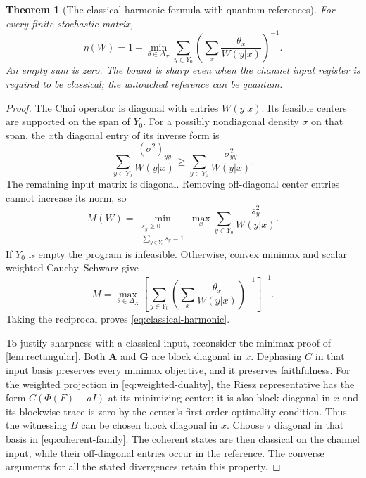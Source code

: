 \documentclass[11pt]{article}
\numberwithin{equation}{section}
\newtheorem{theorem}{Theorem}[section]
\theoremstyle{definition}
\theoremstyle{remark}
\begin{document}
\begin{theorem}[The classical harmonic formula with quantum references]
\label{thm:classical}
For every finite stochastic matrix,
\begin{equation}
 \boxed{\quad
 \eta(W)=1-\min_{\theta\in\Delta_X}
 \sum_{y\in Y_0}
       \left(\sum_x\frac{\theta_x}{W(y|x)}\right)^{-1}.
 \quad}
 \label{eq:classical-harmonic}
\end{equation}
An empty sum is zero. The bound is sharp even when the channel input
register is required to be classical; the untouched reference can be
quantum.
\end{theorem}
\begin{proof}
The Choi operator is diagonal with entries $W(y|x)$.
Its feasible centers are supported on the span of $Y_0$.
For a possibly nondiagonal density $\sigma$ on that span, the
$x$th diagonal entry of its inverse form is
\[
 \sum_{y\in Y_0}\frac{(\sigma^2)_{yy}}{W(y|x)}
 \geq\sum_{y\in Y_0}\frac{\sigma_{yy}^2}{W(y|x)}.
\]
The remaining input matrix is diagonal. Removing off-diagonal center
entries cannot increase its norm, so
\begin{equation}
 M(W)=\min_{\substack{s_y\geq0\\\sum_{y\in Y_0}s_y=1}}
          \max_x\sum_{y\in Y_0}\frac{s_y^2}{W(y|x)}.
 \label{eq:classical-primal}
\end{equation}
If $Y_0$ is empty the program is infeasible. Otherwise, convex minimax
and scalar weighted Cauchy--Schwarz give
\[
 M=\max_{\theta\in\Delta_X}
 \left[\sum_{y\in Y_0}
       \left(\sum_x\frac{\theta_x}{W(y|x)}\right)^{-1}\right]^{-1}.
\]
Taking the reciprocal proves \eqref{eq:classical-harmonic}.

To justify sharpness with a classical input, reconsider the minimax
proof of \cref{lem:rectangular}. Both $\mathbf A$ and $\mathbf G$ are
block diagonal in $x$. Dephasing $C$ in that input basis preserves
every minimax objective, and it preserves faithfulness.
For the weighted projection in \eqref{eq:weighted-duality}, the
Riesz representative has the form $C(\Phi(F)-aI)$ at its minimizing
center; it is also block diagonal in $x$ and its blockwise trace is
zero by the center's first-order optimality condition.
Thus the witnessing $B$ can be chosen block diagonal in $x$.
Choose $\tau$ diagonal in that basis in \eqref{eq:coherent-family}.
The coherent states are then classical on the channel input, while
their off-diagonal entries occur in the reference. The converse
arguments for all the stated divergences retain this property.
\end{proof}
\end{document}
